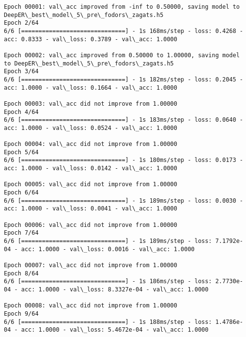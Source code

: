 \documentclass[11pt]{article}
\begin{document}
\begin{Verbatim}[commandchars=\\\{\}]
Epoch 00001: val\_acc improved from -inf to 0.50000, saving model to DeepER\_best\_model\_5\_pre\_fodors\_zagats.h5
Epoch 2/64
6/6 [==============================] - 1s 168ms/step - loss: 0.4268 - acc: 0.8333 - val\_loss: 0.3789 - val\_acc: 1.0000

Epoch 00002: val\_acc improved from 0.50000 to 1.00000, saving model to DeepER\_best\_model\_5\_pre\_fodors\_zagats.h5
Epoch 3/64
6/6 [==============================] - 1s 182ms/step - loss: 0.2045 - acc: 1.0000 - val\_loss: 0.1664 - val\_acc: 1.0000

Epoch 00003: val\_acc did not improve from 1.00000
Epoch 4/64
6/6 [==============================] - 1s 183ms/step - loss: 0.0640 - acc: 1.0000 - val\_loss: 0.0524 - val\_acc: 1.0000

Epoch 00004: val\_acc did not improve from 1.00000
Epoch 5/64
6/6 [==============================] - 1s 180ms/step - loss: 0.0173 - acc: 1.0000 - val\_loss: 0.0142 - val\_acc: 1.0000

Epoch 00005: val\_acc did not improve from 1.00000
Epoch 6/64
6/6 [==============================] - 1s 189ms/step - loss: 0.0030 - acc: 1.0000 - val\_loss: 0.0041 - val\_acc: 1.0000

Epoch 00006: val\_acc did not improve from 1.00000
Epoch 7/64
6/6 [==============================] - 1s 189ms/step - loss: 7.1792e-04 - acc: 1.0000 - val\_loss: 0.0016 - val\_acc: 1.0000

Epoch 00007: val\_acc did not improve from 1.00000
Epoch 8/64
6/6 [==============================] - 1s 186ms/step - loss: 2.7730e-04 - acc: 1.0000 - val\_loss: 8.3327e-04 - val\_acc: 1.0000

Epoch 00008: val\_acc did not improve from 1.00000
Epoch 9/64
6/6 [==============================] - 1s 188ms/step - loss: 1.4786e-04 - acc: 1.0000 - val\_loss: 5.4672e-04 - val\_acc: 1.0000


\end{Verbatim}
\end{document}
